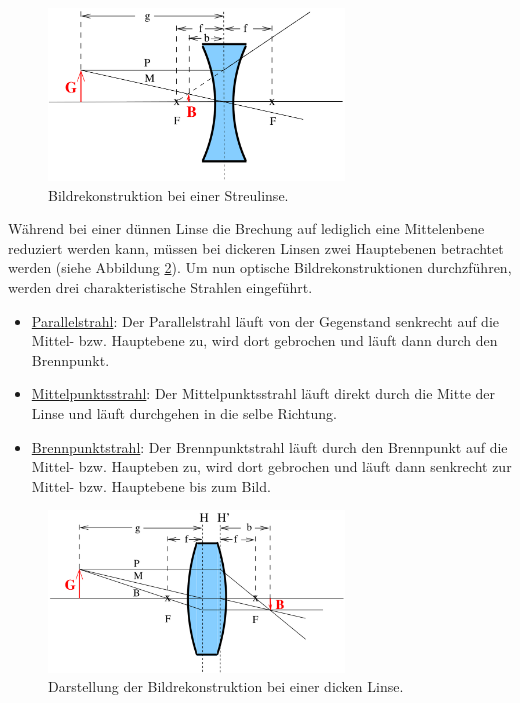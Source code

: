 \begin{figure}
  \centering
  \includegraphics[width = 0.7\textwidth]{Pics/Streulinse.png}
  \caption{Bildrekonstruktion bei einer Streulinse. \cite{anleitung01}}
  \label{fig:Streulinse}
\end{figure}

Während bei einer dünnen Linse die Brechung auf lediglich eine Mittelenbene reduziert
werden kann, müssen bei dickeren Linsen zwei Hauptebenen betrachtet werden (siehe
Abbildung \ref{fig:dickeLinse}). Um nun optische Bildrekonstruktionen durchzführen, werden
drei charakteristische Strahlen eingeführt.

\begin{itemize}
  \item \underline{Parallelstrahl}: Der Parallelstrahl läuft von der Gegenstand
  senkrecht auf die Mittel- bzw. Hauptebene zu, wird dort gebrochen und läuft
  dann durch den Brennpunkt.
  \item \underline{Mittelpunktsstrahl}: Der Mittelpunktsstrahl läuft direkt durch
  die Mitte der Linse und läuft durchgehen in die selbe Richtung.
  \item \underline{Brennpunktstrahl}: Der Brennpunktstrahl läuft durch den Brennpunkt
  auf die Mittel- bzw.  Haupteben zu, wird dort gebrochen und läuft dann senkrecht
  zur Mittel- bzw. Hauptebene bis zum Bild.
\end{itemize}

\begin{figure}
  \centering
  \includegraphics[width = 0.7\textwidth]{Pics/dickeLinse.png}
  \caption{Darstellung der Bildrekonstruktion bei einer dicken Linse.\cite{anleitung01}}
  \label{fig:dickeLinse}
\end{figure}

